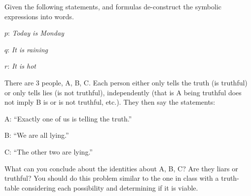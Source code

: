 \documentclass[addpoints]{exam}
\begin{document}
\begin{questions}
\begin{parts}
  \end{parts}

  \question Given the following statements, and formulas de-construct the
  symbolic expressions into words.
  \begin{center}
    $p$: \emph{Today is Monday}

    $q$: \emph{It is raining}

    $r$: \emph{It is hot}
  \end{center}


  \question[12] There are 3 people, A, B, C. Each person either only tells the
  truth (is truthful) or only tells lies (is not truthful), independently (that
  is A being truthful does not imply B is or is not truthful, etc.). They then
  say the statements:

  \begin{center}
    A: ``Exactly one of us is telling the truth.''

    B: ``We are all lying.''

    C: ``The other two are lying.''
  \end{center}

  What can you conclude about the identities about A, B, C? Are they liars or
  truthful? You should do this problem similar to the one in class with a
  truth-table considering each possibility and determining if it is viable.
  \begin{solution}


\end{solution}
\end{questions}
\end{document}
